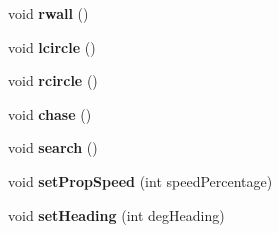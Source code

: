 \begin{DoxyCompactItemize}
\item 
void {\bfseries rwall} ()\hypertarget{class_tugboat_adb616d83ba2908bc0f4fcd1c29c863d3}{}\label{class_tugboat_adb616d83ba2908bc0f4fcd1c29c863d3}

\item 
void {\bfseries lcircle} ()\hypertarget{class_tugboat_ac018e513f92bd6b9168025f8a12311db}{}\label{class_tugboat_ac018e513f92bd6b9168025f8a12311db}

\item 
void {\bfseries rcircle} ()\hypertarget{class_tugboat_a9977645035e69a5e8c99ed254de41834}{}\label{class_tugboat_a9977645035e69a5e8c99ed254de41834}

\item 
void {\bfseries chase} ()\hypertarget{class_tugboat_a101bab7ca5aaba38a2df53ed6e412e85}{}\label{class_tugboat_a101bab7ca5aaba38a2df53ed6e412e85}

\item 
void {\bfseries search} ()\hypertarget{class_tugboat_abb4429bf50007be2db232f3b91ff7c54}{}\label{class_tugboat_abb4429bf50007be2db232f3b91ff7c54}

\item 
void {\bfseries set\+Prop\+Speed} (int speed\+Percentage)\hypertarget{class_tugboat_a20279b6d34fcc7b170f6962bcf727b02}{}\label{class_tugboat_a20279b6d34fcc7b170f6962bcf727b02}

\item 
void {\bfseries set\+Heading} (int deg\+Heading)\hypertarget{class_tugboat_a070a494b55440c75f4f03252adc8471b}{}\label{class_tugboat_a070a494b55440c75f4f03252adc8471b}

\end{DoxyCompactItemize}
